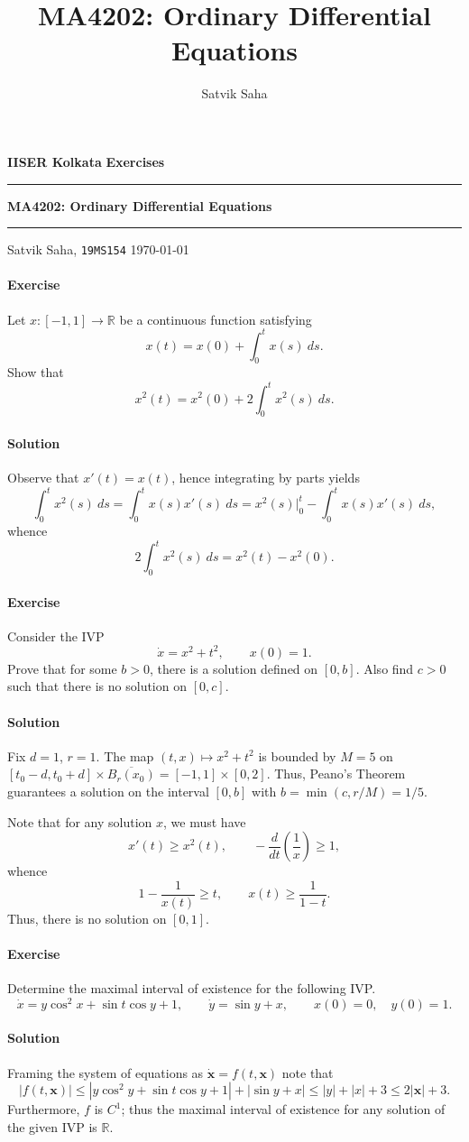 \documentclass[10pt]{article}
\title{MA4202: Ordinary Differential Equations}
\author{Satvik Saha}
\date{}
\newcounter{prob}
\newcommand{\problem}{\stepcounter{prob}\paragraph{Exercise \arabic{prob}}}
\newcommand{\solution}{\paragraph{Solution}}
\newcommand{\R}{\mathbb{R}}
\begin{document}
    \noindent\textbf{IISER Kolkata} \hfill \textbf{Exercises}
    \vspace{3pt}
    \hrule
    \vspace{3pt}
    \begin{center}
    \LARGE{\textbf{MA4202: Ordinary Differential Equations}}
    \end{center}
    \vspace{3pt}
    \hrule
    \vspace{3pt}
    Satvik Saha, \texttt{19MS154} \hfill \today
    \vspace{20pt}



    \problem Let $x: [-1, 1] \to \R$ be a continuous function satisfying \[
        x(t) = x(0) + \int_0^t x(s)\:ds.
    \] Show that \[
        x^2(t) = x^2(0) + 2\int_0^t x^2(s)\:ds.
    \]

    \solution Observe that $x'(t) = x(t)$, hence integrating by parts yields \[
        \int_0^t x^2(s)\:ds = \int_0^t x(s) x'(s)\:ds = x^2(s)\Big|_0^t - \int_0^t
        x(s)x'(s)\:ds,
    \] whence \[
        2\int_0^t x^2(s)\:ds = x^2(t) - x^2(0).
    \]


    \problem Consider the IVP \[
        \dot{x} = x^2 + t^2, \qquad
        x(0) = 1.
    \] Prove that for some $b > 0$, there is a solution defined on $[0, b]$. Also
    find $c > 0$ such that there is no solution on $[0, c]$.

    \solution Fix $d = 1$, $r = 1$. The map $(t, x) \mapsto x^2 + t^2$ is bounded by
    $M = 5$ on $[t_0 - d, t_0 + d] \times \overline{B_r(x_0)} = [-1, 1]\times[0, 2]$.
    Thus, Peano's Theorem guarantees a solution on the interval $[0, b]$ with $b =
    \min(c, r/M) = 1/5$.

    Note that for any solution $x$, we must have \[
        x'(t) \geq x^2(t), \qquad -\frac{d}{dt}\left(\frac{1}{x}\right) \geq 1,
    \] whence \[
        1 - \frac{1}{x(t)} \geq t, \qquad x(t) \geq \frac{1}{1 - t}.
    \] Thus, there is no solution on $[0, 1]$.


    \problem Determine the maximal interval of existence for the following IVP. \[
        \dot{x} = y\cos^2{x} + \sin{t}\cos{y} + 1, \qquad
        \dot{y} = \sin{y} + x, \qquad
        x(0) = 0, \quad
        y(0) = 1.
    \]

    \solution Framing the system of equations as $\dot{\bm{x}} = f(t, \bm{x})$ note
    that \[
        |f(t, \bm{x})| \leq |y\cos^2{y} + \sin{t}\cos{y} + 1| + |\sin{y} + x|
        \leq |y| + |x| + 3 \leq 2|\bm{x}| + 3.
    \] Furthermore, $f$ is $C^1$; thus the maximal interval of existence for any
    solution of the given IVP is $\R$.
\end{document}
